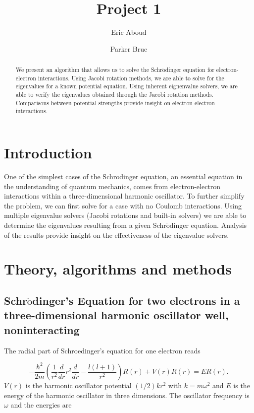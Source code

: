 \documentclass[%
reprint,
superscriptaddress,
showpacs,
nofootinbib,
bibnotes,amsmath,amssymb,aps,
prc, 
]{revtex4-1}
\begin{document}
	\title{Project 1}
	\author{Eric Aboud}
	\author{Parker Brue}
	\begin{abstract}
		We present an algorithm that allows us to solve the Schr$\ddot{\textrm{o}}$dinger equation for electron-electron interactions.  Using Jacobi rotation methods, we are able to solve for the eigenvalues for a known potential equation.  Using inherent eignenvalue solvers, we are able to verify the eigenvalues obtained through the Jacobi rotation methods.  Comparisons between potential strengths provide insight on electron-electron interactions.
	\end{abstract}
	\maketitle
	
	
	\section{Introduction}
	
	One of the simplest cases of the Schr$\ddot{\textrm{o}}$dinger equation, an essential equation in the understanding of quantum mechanics, comes from electron-electron interactions within a three-dimensional harmonic oscillator.  To further simplify the problem, we can first solve for a case with no Coulomb interactions.  Using multiple eigenvalue solvers (Jacobi rotations and built-in solvers) we are able to determine the eigenvalues resulting from a given Schr$\ddot{\textrm{o}}$dinger equation.  Analysis of the results provide insight on the effectiveness of the eigenvalue solvers.
	
	
	\section{Theory, algorithms and methods}
	\subsection{Schr$\ddot{\textrm{o}}$dinger's Equation for two electrons in a three-dimensional harmonic oscillator well, noninteracting}	
	The radial part of Schroedinger's equation for one electron reads
	
	\begin{equation*}
		-\frac{\hbar^2}{2 m} \left ( \frac{1}{r^2} \frac{d}{dr} r^2
		\frac{d}{dr} - \frac{l (l + 1)}{r^2} \right )R(r) 
		+ V(r) R(r) = E R(r).
	\end{equation*}
	$V(r)$ is the harmonic oscillator potential $(1/2)kr^2$ with
	$k=m\omega^2$ and $E$ is
	the energy of the harmonic oscillator in three dimensions.
	The oscillator frequency is $\omega$ and the energies are
	
\end{document}
